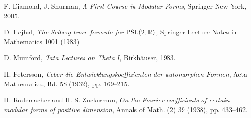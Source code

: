 \begin{thebibliography}{10}



   {\sc F. Diamond, J. Shurman}, \emph{A First Course in Modular Forms}, Springer New York, 2005.



   {\sc D. Hejhal}, {\em The Selberg trace formula for $\mathrm{PSL}(2, \mathbb{R})$},  Springer Lecture Notes in Mathematics 1001 (1983)


   {\sc D. Mumford}, {\em Tata Lectures on Theta I}, Birkh\"auser, 1983.



   {\sc H. Petersson}, {\em Ueber die Entwicklungskoeffizienten der automorphen Formen}, Acta Mathematica, Bd. 58 (1932),  pp. 169--215.


   {\sc H. Rademacher and H. S. Zuckerman}, {\em On the Fourier coefficients of certain modular forms of
  positive dimension}, Annals of Math. (2) 39 (1938),  pp. 433--462.



\end{thebibliography}

